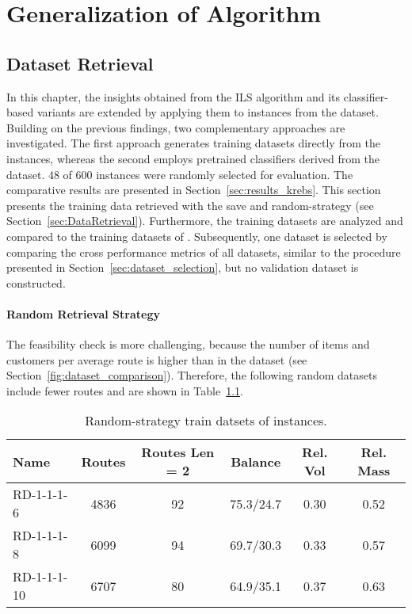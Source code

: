
\chapter{Generalization of Algorithm}
\label{chap:application_krebs}

\section{Dataset Retrieval}
\label{sec:krebs_data_retrieval}

In this chapter, the insights obtained from the \gls{ILS} algorithm and its classifier-based variants are extended by
applying them to instances from the \krebsADataSetText dataset. Building on
the previous findings, two complementary approaches are investigated. The first approach generates training datasets
directly from the \krebsADataSetText instances, whereas the second employs pretrained classifiers derived from the
\gendreauDataSetText dataset. 48 of 600 instances were randomly selected for evaluation.
The comparative results are presented in Section~\ref{sec:results_krebs}.
This section presents the training data retrieved with the save and random-strategy (see Section~\ref{sec:DataRetrieval}). Furthermore,
the training datasets are analyzed and compared to the training datasets of \gendreauDataSet. Subsequently, one dataset is selected by
comparing the cross performance metrics of all datasets, similar to the procedure presented in Section~\ref{sec:dataset_selection}, but no
validation dataset is constructed.

\subsubsection{Random Retrieval Strategy}
The feasibility check is more challenging, because the number of items and customers per average route is higher than in the
\gendreauDataSetText dataset (see Section~\ref{fig:dataset_comparison}). Therefore, the following random datasets include fewer
routes and are shown in Table~\ref{tab:random_instances_krebs}.
\begin{table}[ht]
    \centering
    \small
    \begin{tabular}{l c c c c c }
        \toprule
        Name        & Routes & Routes Len = 2 & Balance   & Rel. Vol & Rel. Mass \\
        \midrule
        RD-1-1-1-6  & 4836   & 92             & 75.3/24.7 & 0.30     & 0.52      \\
        RD-1-1-1-8  & 6099   & 94             & 69.7/30.3 & 0.33     & 0.57      \\
        RD-1-1-1-10 & 6707   & 80             & 64.9/35.1 & 0.37     & 0.63      \\

        \bottomrule
    \end{tabular}
    \caption{Random-strategy train datsets of \krebsADataSet instances.}
    \label{tab:random_instances_krebs}
\end{table}

